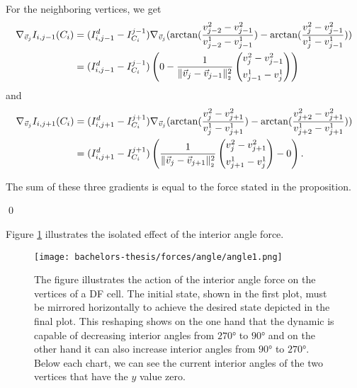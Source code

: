 \begin{proposition}
	For the neighboring vertices, we get 
	\begin{align*}
		\nabla_{\vec{v}_j}  I_{i, j-1}(C_i) 
		&= (I_{i, j-1}^d - I^{j-1}_{C_i}) \nabla_{\vec{v}_j} (\arctan(\frac{v_{j-2}^2 - v_{j-1}^2}{v_{j-2}^1 - v_{j-1}^1}) - \arctan(\frac{v_{j}^2 - v_{j-1}^2}{v_{j}^1 - v_{j-1}^1})) \\
		&= (I_{i, j-1}^d - I^{j-1}_{C_i}) \left( 0
		  - \frac{1}{\norm[\vec{v}_{j} - \vec{v}_{j-1}]^2} \begin{pmatrix}
			v_{j}^2 - v_{j-1}^2 \\[0.5em]
			v_{j-1}^1 - v_{j}^1
		\end{pmatrix} 
		\right) 
	\end{align*}
	and 
	\begin{align*}
		\nabla_{\vec{v}_j}  I_{i, j+1}(C_i) 
		&= (I_{i, j+1}^d - I^{j+1}_{C_i}) \nabla_{\vec{v}_j} (\arctan(\frac{v_{j}^2 - v_{j+1}^2}{v_{j}^1 - v_{j+1}^1}) - \arctan(\frac{v_{j+2}^2 - v_{j+1}^2}{v_{j+2}^1 - v_{j+1}^1})) \\
		&= (I_{i, j+1}^d - I^{j+1}_{C_i}) \left( \frac{1}{\norm[\vec{v}_{j} - \vec{v}_{j+1}]^2} \begin{pmatrix}
			v_{j}^2 - v_{j+1}^2 \\[0.5em]
			v_{j+1}^1 - v_{j}^1
		\end{pmatrix} 
		  - 0
		\right). 
	\end{align*}

	The sum of these three gradients is equal to the force stated in the proposition. 
	
	\qed
\end{proposition}


Figure \ref{fig:angleForce} illustrates the isolated effect of the interior angle force.

\begin{figure}
	\begin{center}
		\texttt{[image: bachelors-thesis/forces/angle/angle1.png]}
		\caption{The figure illustrates the action of the interior angle force on the vertices of a DF cell.
		The initial state, shown in the first plot, must be mirrored horizontally to achieve the desired state depicted in the final plot.
		This reshaping shows on the one hand that the dynamic is capable of decreasing interior angles from $270$° to $90$° and on the other hand it can also increase interior angles from $90$° to $270$°. 
		Below each chart, we can see the current interior angles of the two vertices that have the $y$ value zero. 
		}
		\label{fig:angleForce}
	\end{center}
\end{figure}





